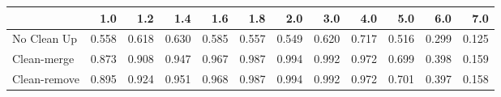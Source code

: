 \begin{tabular}{lrrrrrrrrrrr}
\toprule
{} &   1.0 &   1.2 &   1.4 &   1.6 &   1.8 &   2.0 &   3.0 &   4.0 &   5.0 &   6.0 &   7.0 \\
\midrule
No Clean Up  & 0.558 & 0.618 & 0.630 & 0.585 & 0.557 & 0.549 & 0.620 & 0.717 & 0.516 & 0.299 & 0.125 \\
Clean-merge  & 0.873 & 0.908 & 0.947 & 0.967 & 0.987 & 0.994 & 0.992 & 0.972 & 0.699 & 0.398 & 0.159 \\
Clean-remove & 0.895 & 0.924 & 0.951 & 0.968 & 0.987 & 0.994 & 0.992 & 0.972 & 0.701 & 0.397 & 0.158 \\
\bottomrule
\end{tabular}
